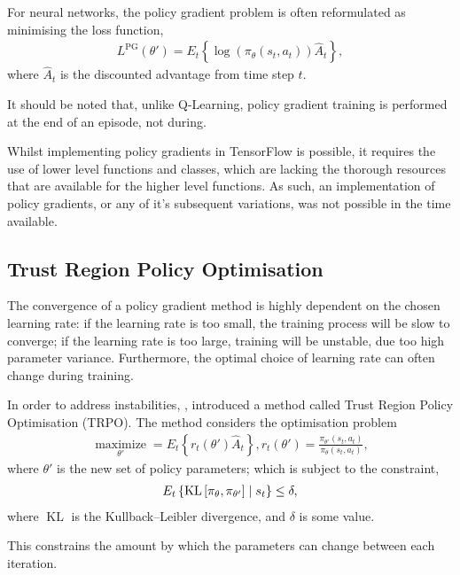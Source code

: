 For neural networks, the policy gradient problem is often reformulated as
minimising the loss function,
\begin{align*}
    L^\text{PG}(\theta') = E_t\left\{
        \log(\pi_\theta(s_t,a_t))\hat{A}_t
    \right\},
\end{align*}
where $\hat{A}_t$ is the discounted advantage from time step $t$.

It should be noted that, unlike Q-Learning, policy gradient training is
performed at the end of an episode, not during.

Whilst implementing policy gradients in TensorFlow is possible, it requires the
use of lower level functions and classes, which are lacking the thorough
resources that are available for the higher level functions.
As such, an implementation of policy gradients, or any of it's subsequent
variations, was not possible in the time available.



\subsection{Trust Region Policy Optimisation}

The convergence of a policy gradient method is highly dependent on the chosen
learning rate:
if the learning rate is too small, the training process will be slow to
converge;
if the learning rate is too large, training will be unstable, due too high
parameter variance.
Furthermore, the optimal choice of learning rate can often change during
training.

In order to address instabilities, \cite{Schulman:2015:Trust}, introduced a
method called Trust Region Policy Optimisation (TRPO).
The method considers the optimisation problem
\begin{align*}
    \underset{\theta'}{\operatorname{maximize}} = E_t\left\{
        r_t(\theta')\hat{A}_t
    \right\},
    r_t(\theta') = \frac{\pi_{\theta'}(s_t,a_t)}{\pi_{\theta}(s_t,a_t)},
\end{align*}
where $\theta'$ is the new set of policy parameters; which is subject to the
constraint,
\begin{align*}
    E_t\left\{ \operatorname{KL}\left[\pi_{\theta},\pi_{\theta'}\right]
        \;\middle|\; s_t
    \right\} \leq \delta,
\end{align*}
where $\operatorname{KL}$ is the Kullback–Leibler divergence, and $\delta$ is
some value.

This constrains the amount by which the parameters can change between each
iteration.


